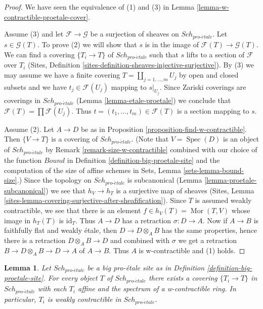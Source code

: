 \documentclass{stacks-project}
\theoremstyle{plain}
\newtheorem{lemma}[subsection]{Lemma}
\theoremstyle{definition}
\theoremstyle{remark}
\numberwithin{equation}{subsection}
\def\Spec{\mathop{\mathrm{Spec}}}
\def\Sch{\mathit{Sch}}
\def\Mor{\mathop{\mathrm{Mor}}\nolimits}
\def\proetale{{pro\text{-}\acute{e}tale}}
\begin{document}
\begin{proof}
We have seen the equivalence of (1) and (3) in
Lemma \ref{lemma-w-contractible-proetale-cover}.

\medskip\noindent
Assume (3) and let $\mathcal{F} \to \mathcal{G}$ be a surjection of sheaves on
$\Sch_\proetale$. Let $s \in \mathcal{G}(T)$. To prove (2) we will show that
$s$ is in the image of $\mathcal{F}(T) \to \mathcal{G}(T)$. We can find a
covering $\{T_i \to T\}$ of $\Sch_\proetale$ such that $s$ lifts
to a section of $\mathcal{F}$ over $T_i$
(Sites, Definition \ref{sites-definition-sheaves-injective-surjective}).
By (3) we may assume we have a finite covering
$T = \coprod_{j = 1, \ldots, m} U_j$ by open and closed subsets
and we have $t_j \in \mathcal{F}(U_j)$ mapping to $s|_{U_j}$.
Since Zariski coverings are coverings in $\Sch_\proetale$
(Lemma \ref{lemma-etale-proetale}) we conclude that
$\mathcal{F}(T) = \prod \mathcal{F}(U_j)$.
Thus $t = (t_1, \ldots, t_m) \in \mathcal{F}(T)$
is a section mapping to $s$.

\medskip\noindent
Assume (2). Let $A \to D$ be as in
Proposition \ref{proposition-find-w-contractible}.
Then $\{V \to T\}$ is a covering of $\Sch_\proetale$.
(Note that $V = \Spec(D)$ is an object of $\Sch_\proetale$
by Remark \ref{remark-size-w-contractible}
combined with our choice of the function
$Bound$ in Definition \ref{definition-big-proetale-site}
and the computation of the size of affine schemes in
Sets, Lemma \ref{sets-lemma-bound-size}.)
Since the topology on $\Sch_\proetale$ is subcanonical
(Lemma \ref{lemma-proetale-subcanonical})
we see that $h_V \to h_T$ is a surjective map of sheaves
(Sites, Lemma \ref{sites-lemma-covering-surjective-after-sheafification}).
Since $T$ is assumed weakly contractible, we see that there is an element
$f \in h_V(T) = \Mor(T, V)$ whose image in $h_T(T)$ is $\text{id}_T$.
Thus $A \to D$ has a retraction $\sigma : D \to A$.
Now if $A \to B$ is faithfully flat and weakly \'etale, then
$D \to D \otimes_A B$ has the same properties, hence
there is a retraction $D \otimes_A B \to D$ and combined
with $\sigma$ we get a retraction $B \to D \otimes_A B \to D \to A$
of $A \to B$. Thus $A$ is w-contractible and (1) holds.
\end{proof}

\begin{lemma}
\label{lemma-get-many-weakly-contractible}
Let $\Sch_\proetale$ be a big pro-\'etale site as in
Definition \ref{definition-big-proetale-site}.
For every object $T$ of $\Sch_\proetale$ there exists
a covering $\{T_i \to T\}$ in $\Sch_\proetale$
with each $T_i$ affine and the spectrum of a w-contractible
ring. In particular, $T_i$ is weakly contractible in $\Sch_\proetale$.
\end{lemma}
\end{document}
